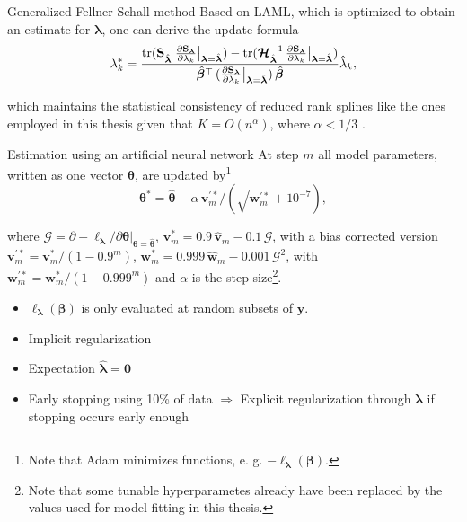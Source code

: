 \documentclass[xcolor=dvipsnames]{beamer}
\begin{document}
\begin{frame}{Generalized Fellner-Schall method}
  Based on \ac{LAML}, which is optimized to obtain an estimate for $\bm{\lambda}$, one can derive the update formula
  \begin{equation}
    \lambda^*_k =
    \frac{\mathrm{tr}(\text{\textbf{S}}_{\hat{\bm{\lambda}}}^- \,
    \frac{\partial \text{\textbf{S}}_{\bm{\lambda}}}{\partial \lambda_k}\big{|}_{\bm{\lambda} = \hat{\bm{\lambda}}})
    - \mathrm{tr}(\bm{\mathcal{H}}_{\hat{\bm{\lambda}}}^{-1} \,
    \frac{\partial \text{\textbf{S}}_{\bm{\lambda}}}{\partial \lambda_k}\big{|}_{\bm{\lambda} = \hat{\bm{\lambda}}})}
    {\hat{\bm{\beta}}^\top \,
    (\frac{\partial \text{\textbf{S}}_{\bm{\lambda}}}{\partial \lambda_k}\big{|}_{\bm{\lambda} = \hat{\bm{\lambda}}}) \,
    \hat{\bm{\beta}}}
    \hat{\lambda}_k,
  \end{equation}

  which maintains the statistical consistency of reduced rank splines like the ones employed in this thesis given that $K = O(n^\alpha)$, where $\alpha < 1/3$ \parencite{wood2016newton}. \\
\end{frame}

\begin{frame}{Estimation using an artificial neural network}
  At step $m$ all model parameters, written as one vector $\bm{\theta}$, are updated by\footnote{Note that Adam minimizes functions, e. g. $-\ell_{\bm{\lambda}}(\bm{\beta})$.}
  \begin{equation}
    \bm{\theta}^* = \hat{\bm{\theta}} - \alpha\, \bm{v}_m^{'*} / (\sqrt{\bm{w}_m^{'*}} + 10^{-7}),
  \end{equation}

  where $\bm{\mathcal{G}} = \partial -\ell_{\bm{\lambda}} / \partial \bm{\theta} |_{\bm{\theta} = \hat{\bm{\theta}}}$, $\bm{v}_m^* = 0.9\, \hat{\bm{v}}_m - 0.1\, \bm{\mathcal{G}}$, with a bias corrected version $\bm{v}_m^{'*} = \bm{v}_m^* / (1 - 0.9^m)$, $\bm{w}_m^* = 0.999\, \hat{\bm{w}}_m - 0.001\, \bm{\mathcal{G}}^2$, with $\bm{w}_m^{'*} = \bm{w}_m^* / (1 - 0.999^m)$ and $\alpha$ is the step size\footnote{Note that some tunable hyperparametes already have been replaced by the values used for model fitting in this thesis.}. \\
  \begin{itemize}
    \item $\ell_{\bm{\lambda}}(\bm{\beta})$ is only evaluated at random subsets of $\bm{y}$.
    \item Implicit regularization
    \item Expectation ${\hat{\bm{\lambda}} = \bm{0}}$
    \item Early stopping using 10\% of data $\Rightarrow$ Explicit regularization through $\bm{\lambda}$ if stopping occurs early enough
  \end{itemize}
\end{frame}
\end{document}
